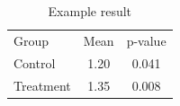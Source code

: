 \begin{table}
\caption{Example result}
\label{tab:result}
\begin{tabular}{lcc}
Group & Mean & p-value \\
Control & 1.20 & 0.041 \\
Treatment & 1.35 & 0.008 \\
\end{tabular}
\end{table}
